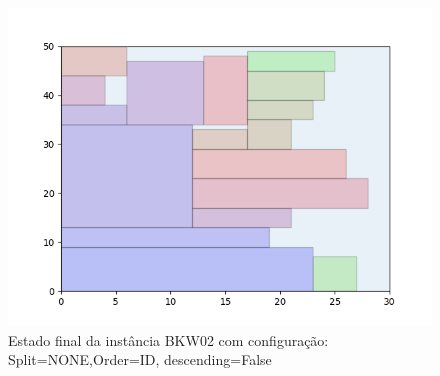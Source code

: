 \begin{figure}[H]
    \centering
    \caption[]{Estado final da instância BKW02 com configuração: Split=NONE,Order=ID, descending=False}
    \label{fig:bkw02-none-id-false}
    \includegraphics[scale=0.5]{output/figures/bkw/bkw02/none/id/false/00}
\end{figure}